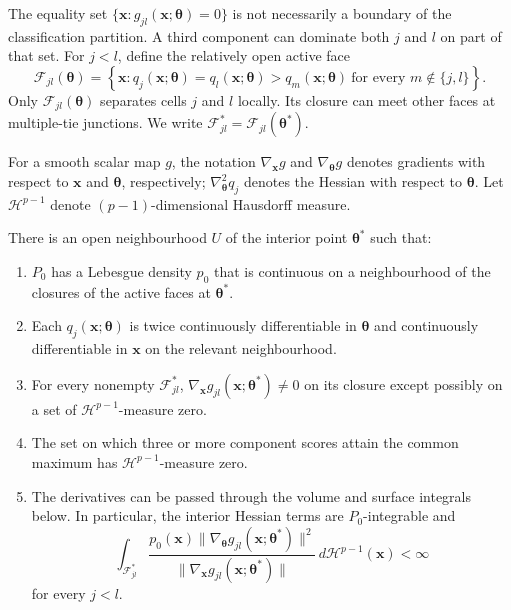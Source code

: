 The equality set $\{\mathbf{x}:g_{jl}(\mathbf{x};\boldsymbol{\theta})=0\}$ is not necessarily a boundary of
the classification partition.  A third component can dominate both $j$ and
$l$ on part of that set.  For $j<l$, define the relatively open active face
\begin{equation}
 \mathcal F_{jl}(\boldsymbol{\theta})
 =\left\{\mathbf{x}:q_j(\mathbf{x};\boldsymbol{\theta})=q_l(\mathbf{x};\boldsymbol{\theta})>
 q_m(\mathbf{x};\boldsymbol{\theta})\ \text{for every }m\notin\{j,l\}\right\}.
 \label{eq:active-face}
\end{equation}
Only $\mathcal F_{jl}(\boldsymbol{\theta})$ separates cells $j$ and $l$ locally.  Its
closure can meet other faces at multiple-tie junctions.  We write
$\mathcal F_{jl}^*=\mathcal F_{jl}(\boldsymbol{\theta}^*)$.

For a smooth scalar map $g$, the notation $\nabla_{\mathbf{x}}g$ and $\nabla_{\boldsymbol{\theta}}g$ denotes
gradients with respect to $\mathbf{x}$ and $\boldsymbol{\theta}$, respectively; $\nabla_{\boldsymbol{\theta}}^2q_j$ denotes
the Hessian with respect to $\boldsymbol{\theta}$.  Let $\mathcal H^{p-1}$ denote
$(p-1)$-dimensional Hausdorff measure.

\begin{assumption}
\label{ass:boundary-geometry}
There is an open neighbourhood $U$ of the interior point $\boldsymbol{\theta}^*$ such that:
\begin{enumerate}
 \item $P_0$ has a Lebesgue density $p_0$ that is continuous on a
 neighbourhood of the closures of the active faces at $\boldsymbol{\theta}^*$.
 \item Each $q_j(\mathbf{x};\boldsymbol{\theta})$ is twice continuously differentiable in $\boldsymbol{\theta}$
 and continuously differentiable in $\mathbf{x}$ on the relevant neighbourhood.
 \item For every nonempty $\mathcal F_{jl}^*$,
 $\nabla_{\mathbf{x}}g_{jl}(\mathbf{x};\boldsymbol{\theta}^*)\ne0$ on its closure except possibly on a set of
 $\mathcal H^{p-1}$-measure zero.
 \item The set on which three or more component scores attain the common
 maximum has $\mathcal H^{p-1}$-measure zero.
 \item The derivatives can be passed through the volume and surface
 integrals below.  In particular, the interior Hessian terms are
 $P_0$-integrable and
 \[
  \int_{\mathcal F_{jl}^*}
  \frac{p_0(\mathbf{x})\|\nabla_{\boldsymbol{\theta}}g_{jl}(\mathbf{x};\boldsymbol{\theta}^*)\|^2}
       {\|\nabla_{\mathbf{x}}g_{jl}(\mathbf{x};\boldsymbol{\theta}^*)\|}
  \,d\mathcal H^{p-1}(\mathbf{x})<\infty
 \]
 for every $j<l$.
\end{enumerate}
\end{assumption}

